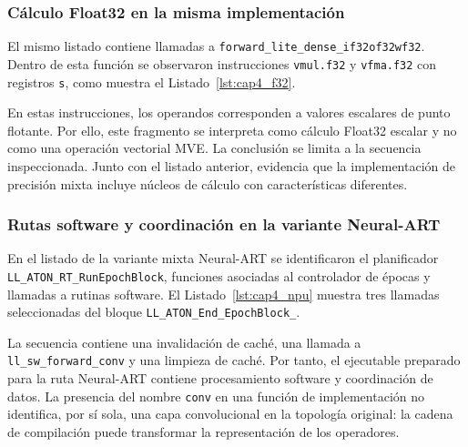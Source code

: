 \subsubsection{Cálculo Float32 en la misma implementación}
El mismo listado contiene llamadas a \texttt{forward\_\allowbreak lite\_\allowbreak dense\_\allowbreak if32of32wf32}. Dentro de esta función se observaron instrucciones \texttt{vmul.f32} y \texttt{vfma.f32} con registros \texttt{s}, como muestra el Listado~\ref{lst:cap4_f32}.


\noindent\begin{minipage}{\linewidth}

\end{minipage}

En estas instrucciones, los operandos corresponden a valores escalares de punto flotante. Por ello, este fragmento se interpreta como cálculo Float32 escalar y no como una operación vectorial MVE. La conclusión se limita a la secuencia inspeccionada. Junto con el listado anterior, evidencia que la implementación de precisión mixta incluye núcleos de cálculo con características diferentes.

\subsubsection{Rutas software y coordinación en la variante Neural-ART}
En el listado de la variante mixta Neural-ART se identificaron el planificador \texttt{LL\_\allowbreak ATON\_\allowbreak RT\_\allowbreak RunEpochBlock}, funciones asociadas al controlador de épocas y llamadas a rutinas software. El Listado~\ref{lst:cap4_npu} muestra tres llamadas seleccionadas del bloque \texttt{LL\_\allowbreak ATON\_\allowbreak End\_\allowbreak EpochBlock\_}.


\noindent\begin{minipage}{\linewidth}

\end{minipage}

La secuencia contiene una invalidación de caché, una llamada a \texttt{ll\_\allowbreak sw\_\allowbreak forward\_\allowbreak conv} y una limpieza de caché. Por tanto, el ejecutable preparado para la ruta Neural-ART contiene procesamiento software y coordinación de datos. La presencia del nombre \texttt{conv} en una función de implementación no identifica, por sí sola, una capa convolucional en la topología original: la cadena de compilación puede transformar la representación de los operadores.

